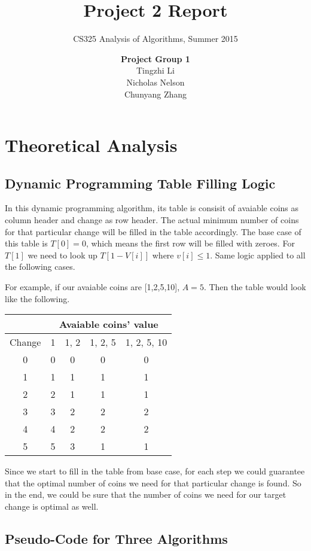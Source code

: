 \documentclass[11pt]{scrreprt}
\title{\textbf{Project 2 Report}}
\subtitle{CS325 Analysis of Algorithms, Summer 2015}
\author{\textsf{\textbf{Project Group 1}}\\
		\textsf{Tingzhi Li}\\
		\textsf{Nicholas Nelson}\\
		\textsf{Chunyang Zhang}}
\date{}
\begin{document}
\maketitle

\chapter{Theoretical Analysis}

\section{Dynamic Programming Table Filling Logic}

In this dynamic programming algorithm, its table is consisit of avaiable coins as column header and change as row header. The actual minimum number of coins for that particular change will be filled in the table accordingly. The base case of this table is $T[0]=0$, which means the first row will be filled with zeroes. For $T[1]$ we need to look up $T[1-V[i]]$ where $v[i]\leq 1$. Same logic applied to all the following cases.

For example, if our avaiable coins are [1,2,5,10], $A=5$. Then the table would look like the following.

\begin{tabular}{|c|c|c|c|c|}
	\hline & \multicolumn{4}{|c|}{Avaiable coins' value} \\
	\hline Change & 1  & 1, 2 & 1, 2, 5 & 1, 2, 5, 10 \\ 
	\hline 0 & 0 & 0 & 0 & 0 \\ 
	\hline 1 & 1 & 1 & 1 & 1 \\ 
	\hline 2 & 2 & 1 & 1 & 1 \\ 
	\hline 3 & 3 & 2 & 2 & 2 \\ 
	\hline 4 & 4 & 2 & 2 & 2 \\ 
	\hline 5 & 5 & 3 & 1 & 1 \\ 
	\hline 
\end{tabular} 

Since we start to fill in the table from base case, for each step we could guarantee that the optimal number of coins we need for that particular change is found. So in the end, we could be sure that the number of coins we need for our target change is optimal as well.

\section{Pseudo-Code for Three Algorithms}
\end{document}
